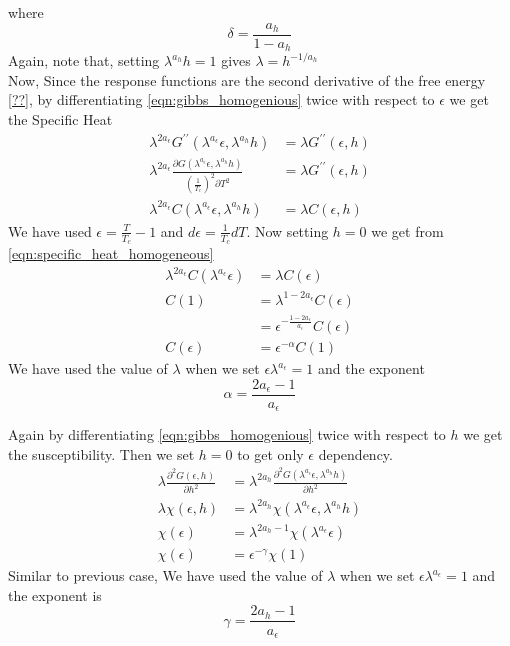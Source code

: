 	where
	\begin{equation}
		\delta = \frac{a_h}{1-a_h}
		\label{eqn:delta}
	\end{equation}
	Again, note that, setting $\lambda^{a_h} h = 1$ gives $\lambda = h^{-1/a_h}$\\
	Now, Since the response functions are the second derivative of the free energy \ref{??}, by differentiating \ref{eqn:gibbs_homogenious} twice with respect to $\epsilon$ we get the Specific Heat
	\begin{align}
		\lambda^{2 a_\epsilon} G^{\prime\prime}(\lambda^{a_\epsilon} \epsilon, \lambda^{a_h} h) &= \lambda G^{\prime \prime}(\epsilon, h) \nonumber \\
		\lambda^{2 a_\epsilon} \frac{\partial G(\lambda^{a_\epsilon} \epsilon, \lambda^{a_h} h)}{\left(\frac{1}{T_c}\right)^2 \partial T^2} &= \lambda G^{\prime \prime}(\epsilon, h) \nonumber \\
		\lambda^{2 a_\epsilon} C(\lambda^{a_\epsilon} \epsilon, \lambda^{a_h} h) &= \lambda C(\epsilon, h)
		\label{eqn:specific_heat_homogeneous}
	\end{align}
	We have used $\epsilon = \frac{T}{T_c} -1$ and $d\epsilon = \frac{1}{T_c} dT$. Now setting $h=0$ we get from \ref{eqn:specific_heat_homogeneous}
	\begin{align}
		\lambda^{2 a_\epsilon} C(\lambda^{a_\epsilon} \epsilon) &= \lambda C(\epsilon) \nonumber \\
		C(1) &= \lambda^{1- 2 a_\epsilon} C(\epsilon) \nonumber \\
			 &= \epsilon^{-\frac{1-2 a_\epsilon}{a_\epsilon}} C(\epsilon) \nonumber \\
		C(\epsilon) &= \epsilon^{-\alpha} C(1) \label{eqn:specific_heat_and_alpha}
	\end{align}
	We have used the value of $\lambda$ when we set $\epsilon \lambda^{a_\epsilon}=1$ and the exponent
	\begin{equation}
		\alpha = \frac{2 a_\epsilon - 1}{a_\epsilon}
		\label{eqn:alpha}
	\end{equation}
	
	Again by differentiating \ref{eqn:gibbs_homogenious} twice with respect to $h$ we get the susceptibility. Then we set $h=0$ to get only $\epsilon$ dependency.
	\begin{align}
		\lambda \frac{\partial^2 G(\epsilon,h)}{\partial h^2} &= \lambda^{2 a_h} \frac{\partial^2 G(\lambda^{a_\epsilon} \epsilon, \lambda^{a_h} h)}{\partial h^2} \nonumber \\
		\lambda \chi(\epsilon, h) &= \lambda^{2 a_h} \chi(\lambda^{a_\epsilon}\epsilon, \lambda^{a_h} h) \nonumber \\
		\chi(\epsilon) &= \lambda^{2 a_h - 1} \chi(\lambda ^{a_\epsilon} \epsilon) \nonumber \\
		\chi(\epsilon) &= \epsilon^{-\gamma} \chi(1) 
		\label{eqn:susceptibility_homogeneous}
	\end{align}
	Similar to previous case, We have used the value of $\lambda$ when we set $\epsilon \lambda^{a_\epsilon}=1$ and the exponent is
	\begin{equation}
		\gamma = \frac{2 a_h -1}{a_\epsilon}
		\label{eqn:gamma}
	\end{equation}
